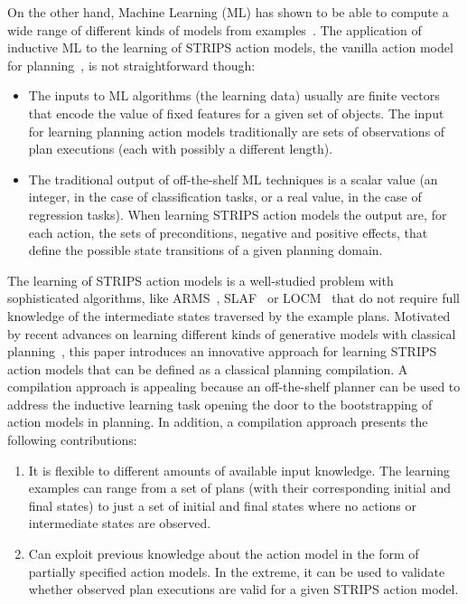 \documentclass[letterpaper]{article} %
\begin{document}
On the other hand, Machine Learning (ML) has shown to be able to compute a wide range of different kinds of models from examples~\cite{michalski2013machine}. The application of inductive ML to the learning of STRIPS action models, the vanilla action model for planning~\cite{fikes1971strips}, is not straightforward though:
\begin{itemize}
\item The inputs to ML algorithms (the learning data) usually are finite vectors that encode the value of fixed features for a given set of objects. The input for learning planning action models traditionally are sets of observations of plan executions (each with possibly a different length).
\item The traditional output of off-the-shelf ML techniques is a scalar value (an integer, in the case of classification tasks, or a real value, in the case of regression tasks). When learning STRIPS action models the output are, for each action, the sets of preconditions, negative and positive effects, that define the possible state transitions of a given planning domain. 
\end{itemize}

The learning of STRIPS action models is a well-studied problem with sophisticated algorithms, like {\sc ARMS}~\cite{yang2007learning}, {\sc SLAF}~\cite{amir:alearning:JAIR08} or {\sc LOCM}~\cite{cresswell2013acquiring} that do not require full knowledge of the intermediate states traversed by the example plans. Motivated by recent advances on learning different kinds of generative models with classical planning~\cite{bonet2009automatic,segovia2016hierarchical,segovia2017generating}, this paper introduces an innovative approach for learning STRIPS action models that can be defined as a classical planning compilation. A compilation approach is appealing because an off-the-shelf planner can be used to address the inductive learning task opening the door to the bootstrapping of action models in planning. In addition, a compilation approach presents the following contributions:
\begin{enumerate}
\item It is flexible to different amounts of available input knowledge. The learning examples can range from a set of plans (with their corresponding initial and final states) to just a set of initial and final states where no actions or intermediate states are observed.
\item Can exploit previous knowledge about the action model in the form of partially specified action models. In the extreme, it can be used to validate whether observed plan executions are valid for a given STRIPS action model.
\end{enumerate}
\end{document}
